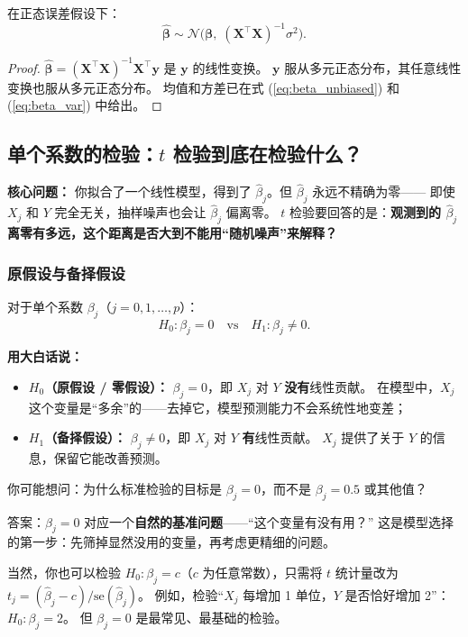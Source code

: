 \begin{theorem}
在正态误差假设下：
\begin{equation}\label{eq:beta_normal}
    \boxed{\hat{\bm{\beta}} \sim \mathcal{N}\big(\bm{\beta},\; (\mathbf{X}^\top \mathbf{X})^{-1} \sigma^2\big)}.
\end{equation}
\end{theorem}

\begin{proof}
$\hat{\bm{\beta}} = (\mathbf{X}^\top \mathbf{X})^{-1} \mathbf{X}^\top \mathbf{y}$ 是 $\mathbf{y}$ 的线性变换。
$\mathbf{y}$ 服从多元正态分布，其任意线性变换也服从多元正态分布。
均值和方差已在式 (\ref{eq:beta_unbiased}) 和 (\ref{eq:beta_var}) 中给出。
\end{proof}

\subsection{单个系数的检验：$t$ 检验到底在检验什么？}

\textbf{核心问题：} 你拟合了一个线性模型，得到了 $\hat{\beta}_j$。但 $\hat{\beta}_j$ 永远不精确为零——
即使 $X_j$ 和 $Y$ 完全无关，抽样噪声也会让 $\hat{\beta}_j$ 偏离零。
$t$ 检验要回答的是：\textbf{观测到的 $\hat{\beta}_j$ 离零有多远，这个距离是否大到不能用``随机噪声''来解释？}

\subsubsection{原假设与备择假设}

\begin{definition}[$t$ 检验的假设]
对于单个系数 $\beta_j$（$j = 0, 1, \dots, p$）：
\[
    \boxed{H_0: \beta_j = 0 \quad \text{vs} \quad H_1: \beta_j \neq 0}.
\]
\end{definition}

\textbf{用大白话说：}
\begin{itemize}
    \item \textbf{$H_0$（原假设 / 零假设）：} $\beta_j = 0$，即 $X_j$ 对 $Y$ \textbf{没有}线性贡献。
    在模型中，$X_j$ 这个变量是``多余''的——去掉它，模型预测能力不会系统性地变差；
    \item \textbf{$H_1$（备择假设）：} $\beta_j \neq 0$，即 $X_j$ 对 $Y$ \textbf{有}线性贡献。
    $X_j$ 提供了关于 $Y$ 的信息，保留它能改善预测。
\end{itemize}

\begin{remark}[为什么总是检验 $\beta_j = 0$？]
你可能想问：为什么标准检验的目标是 $\beta_j = 0$，而不是 $\beta_j = 0.5$ 或其他值？

答案：$\beta_j = 0$ 对应一个\textbf{自然的基准问题}——``这个变量有没有用？''
这是模型选择的第一步：先筛掉显然没用的变量，再考虑更精细的问题。

当然，你也可以检验 $H_0: \beta_j = c$（$c$ 为任意常数），只需将 $t$ 统计量改为
$t_j = (\hat{\beta}_j - c) / \mathrm{se}(\hat{\beta}_j)$。
例如，检验``$X_j$ 每增加 1 单位，$Y$ 是否恰好增加 2''：$H_0: \beta_j = 2$。
但 $\beta_j = 0$ 是最常见、最基础的检验。
\end{remark}

